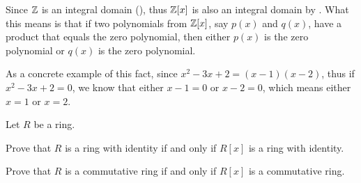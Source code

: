 \begin{example}
    Since $\mathbb{Z}$ is an integral domain (), thus $\mathbb{Z}[x]$ is also an integral domain by . What this means is that if two polynomials from $\mathbb{Z}[x]$, say $p(x)$ and $q(x)$, have a product that equals the zero polynomial, then either $p(x)$ is the zero polynomial or $q(x)$ is the zero polynomial.

    As a concrete example of this fact, since $x^2-3x+2 = (x-1)(x-2)$, thus if $x^2-3x+2 = 0$, we know that either $x-1 = 0$ or $x-2 = 0$, which means either $x = 1$ or $x = 2$.
\end{example}

\begin{exercise}\label{exercise-commutative-ring-with-identity-iff-polynomial-ring-is-also}
    Let $R$ be a ring.
    \begin{partquestions}{\alph*}
        \item Prove that $R$ is a ring with identity if and only if $R[x]$ is a ring with identity.
        \item Prove that $R$ is a commutative ring if and only if $R[x]$ is a commutative ring.
    \end{partquestions}
\end{exercise}

